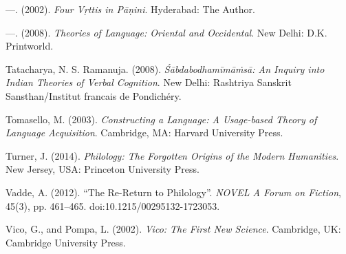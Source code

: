 \begin{thebibliography}{99}
  —. (2002). \textit{Four \textit{Vṛttis} in Pāṇini}. Hyderabad: The Author.

  —. (2008). \textit{Theories of Language: Oriental and Occidental}. New Delhi: D.K. Printworld.

  Tatacharya, N. S. Ramanuja. (2008). \textit{Śābdabodhamīmāṁsā: An Inquiry into Indian Theories of Verbal Cognition}. New Delhi: Rashtriya Sanskrit Sansthan/Institut francais de Pondichéry.

  Tomasello, M. (2003). \textit{Constructing a Language: A Usage-based Theory of Language Acquisition}. Cambridge, MA: Harvard University Press.

  Turner, J. (2014). \textit{Philology: The Forgotten Origins of the Modern Humanities}. New Jersey, USA: Princeton University Press.

  Vadde, A. (2012). “The Re-Return to Philology”. \textit{NOVEL A Forum on Fiction}, 45(3), pp. 461--465. doi:10.1215/00295132-1723053.

  Vico, G., and Pompa, L. (2002). \textit{Vico: The First New Science}. Cambridge, UK: Cambridge University Press.

 \end{thebibliography}

\theendnotes

